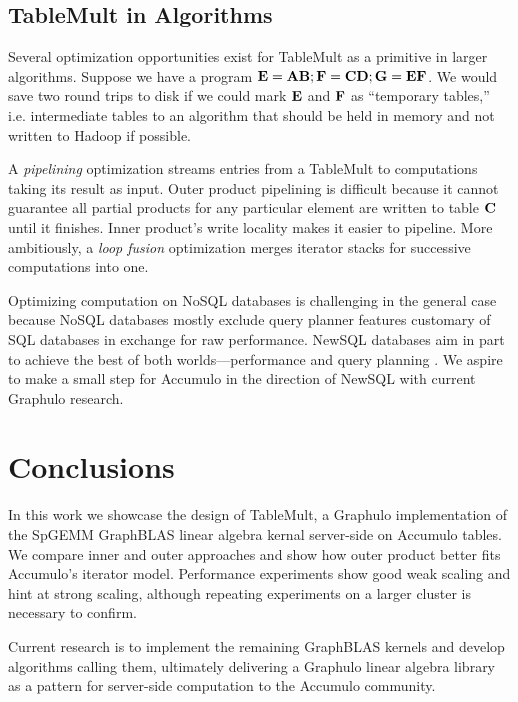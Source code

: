 \subsection{TableMult in Algorithms}
Several optimization opportunities exist for TableMult as a primitive in larger algorithms.
Suppose we have a program $\mathbf{E} = \mathbf{AB}; \mathbf{F} = \mathbf{CD}; \mathbf{G} = \mathbf{EF}$.
We would save two round trips to disk if we could mark $\mathbf{E}$ and $\mathbf{F}$ as 
``temporary tables,'' i.e. intermediate tables to an algorithm that should be held in memory 
and not written to Hadoop if possible.

A \emph{pipelining} optimization streams entries from a TableMult 
to computations taking its result as input. 
Outer product pipelining is difficult
because it cannot guarantee all partial products for any particular element 
are written to table $\mathbf{C}$ until it finishes.
Inner product's write locality makes it easier to pipeline.
More ambitiously, a \emph{loop fusion} optimization merges iterator stacks 
for successive computations into one. 

Optimizing computation on NoSQL databases is challenging in the general case because
NoSQL databases mostly exclude query planner features 
customary of SQL databases in exchange for raw performance.
NewSQL databases aim in part to achieve the best of both worlds---performance and query planning \cite{grolinger2013data}.
We aspire to make a small step for Accumulo in the direction of NewSQL with current Graphulo research.






\section{Conclusions}
\label{sConclusions}

In this work we showcase the design of TableMult, a Graphulo implementation of the 
SpGEMM GraphBLAS linear algebra kernal server-side on Accumulo tables.
We compare inner and outer approaches and show how outer product 
better fits Accumulo's iterator model.
Performance experiments show good weak scaling and hint at strong scaling,
although repeating experiments on a larger cluster is necessary to confirm.

Current research is to implement the remaining GraphBLAS kernels 
and develop algorithms calling them, %
ultimately delivering a Graphulo linear algebra library 
as a pattern for server-side computation
to the Accumulo community.

